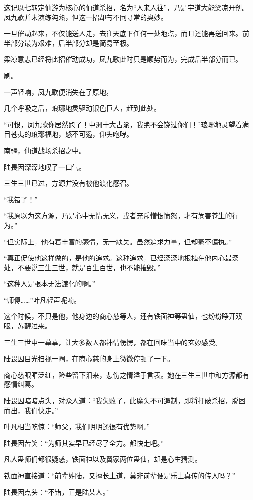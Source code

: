 \begin{this_body}
这记以七转定仙游为核心的仙道杀招，名为“人来人往”，乃是宇道大能梁凉开创。凤九歌并未演练纯熟，但这一招却有不同寻常的奥妙。

一旦催动起来，不仅能送人走，去往天底下任何一处地点，而且还能再送回来。前半部分最为艰难，后半部分却是简易至极。

梁凉意志已经将此招催动成功，凤九歌此时只是顺势而为，完成后半部分而已。

刷。

一声轻响，凤九歌便消失在了原地。

几个呼吸之后，琅琊地灵驱动银色巨人，赶到此处。

“可恨，凤九歌你居然跑了！中洲十大古派，我绝不会饶过你们！”琅琊地灵望着满目苍夷的琅琊福地，怒不可遏，仰头咆哮。

南疆，仙道战场杀招之中。

陆畏因深深地叹了一口气。

三生三世已过，方源并没有被他渡化感召。

“我错了！”

“我原以为这方源，乃是心中无情无义，或者充斥憎恨愤怒，才有危害苍生的行为。”

“但实际上，他有着丰富的感情，无一缺失。虽然追求力量，但却毫不偏执。”

“真正促使他这样做的，是他的追求。这种追求，已经深深地根植在他内心最深处，不要说三生三世，就是百生百世，也不能摧毁。”

“这种人是根本无法渡化的啊。”

“师傅……”叶凡轻声呢喃。

这个时候，不只是他，他身边的商心慈等人，还有铁面神等蛊仙，也纷纷睁开双眼，苏醒过来。

三生三世中一幕幕，让大多数人都神情愣愣，都在回味当中的玄妙感受。

陆畏因目光扫视一圈，在商心慈的身上微微停顿了一下。

商心慈眼眶泛红，险些留下泪来，悲伤之情溢于言表。她在三生三世中和方源都有感情纠葛。

陆畏因暗暗点头，对众人道：“我失败了，此魔头不可遏制，即将打破杀招，脱困而出，我们快走。”

叶凡相当吃惊：“师父，我们明明还很有优势啊。”

陆畏因苦笑：“为师其实早已经尽了全力。都快走吧。”

凡人蛊师们都很疑惑，铁面神以及翼家两位蛊仙，却是心生猜测。

铁面神直接道：“前辈姓陆，又擅长土道，莫非前辈便是乐土真传的传人吗？”

陆畏因点头：“不错，正是陆某人。”


\end{this_body}
